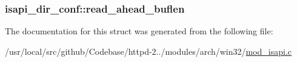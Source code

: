 \subsubsection[{\texorpdfstring{read\+\_\+ahead\+\_\+buflen}{read_ahead_buflen}}]{ isapi\+\_\+dir\+\_\+conf\+::read\+\_\+ahead\+\_\+buflen}\hypertarget{structisapi__dir__conf_a31ff905f11788b562df21900f44423bd}{}\label{structisapi__dir__conf_a31ff905f11788b562df21900f44423bd}


The documentation for this struct was generated from the following file\+:\begin{DoxyCompactItemize}
\item 
/usr/local/src/github/\+Codebase/httpd-\/2../modules/arch/win32/\hyperlink{mod__isapi_8c}{mod\+\_\+isapi.\+c}\end{DoxyCompactItemize}
